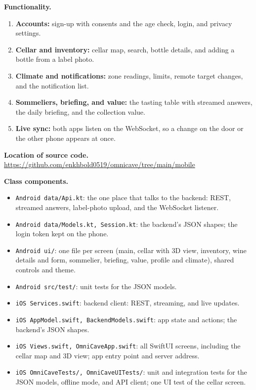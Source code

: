 \documentclass[conference]{IEEEtran}
\begin{document}
\textbf{Functionality.}
\begin{enumerate}
    \item \textbf{Accounts:} sign-up with consents and the age check, login, and privacy settings.
    \item \textbf{Cellar and inventory:} cellar map, search, bottle details, and adding a bottle from a label photo.
    \item \textbf{Climate and notifications:} zone readings, limits, remote target changes, and the notification list.
    \item \textbf{Sommeliers, briefing, and value:} the tasting table with streamed answers, the daily briefing, and the collection value.
    \item \textbf{Live sync:} both apps listen on the WebSocket, so a change on the door or the other phone appears at once.
\end{enumerate}

\textbf{Location of source code.} \url{https://github.com/enkhbold0519/omnicave/tree/main/mobile}

\textbf{Class components.}
\begin{itemize}
    \item \texttt{Android data/Api.kt}: the one place that talks to the backend: REST, streamed answers, label-photo upload, and the WebSocket listener.
    \item \texttt{Android data/Models.kt, Session.kt}: the backend's JSON shapes; the login token kept on the phone.
    \item \texttt{Android ui/}: one file per screen (main, cellar with 3D view, inventory, wine details and form, sommelier, briefing, value, profile and climate), shared controls and theme.
    \item \texttt{Android src/test/}: unit tests for the JSON models.
    \item \texttt{iOS Services.swift}: backend client: REST, streaming, and live updates.
    \item \texttt{iOS AppModel.swift, BackendModels.swift}: app state and actions; the backend's JSON shapes.
    \item \texttt{iOS Views.swift, OmniCaveApp.swift}: all SwiftUI screens, including the cellar map and 3D view; app entry point and server address.
    \item \texttt{iOS OmniCaveTests/, OmniCaveUITests/}: unit and integration tests for the JSON models, offline mode, and API client; one UI test of the cellar screen.
\end{itemize}
\end{document}
